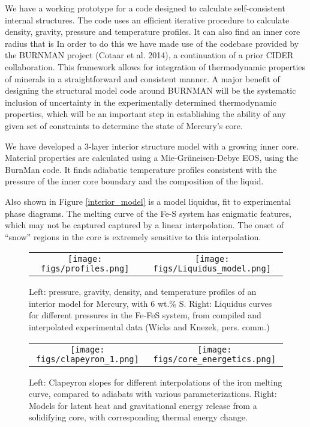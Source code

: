 We have a working prototype for a code designed to calculate self-consistent
internal structures. The code uses an efficient iterative procedure to
calculate density, gravity, pressure and temperature profiles. It can also find
an inner core radius that is In order to do this we have made use of the
codebase provided by the BURNMAN project (Cotaar et al. 2014), a continuation
of a prior CIDER collaboration. This framework allows for integration of
thermodynamic properties of minerals in a straightforward and consistent
manner. A major benefit of designing the structural model code around BURNMAN
will be the systematic inclusion of uncertainty in the experimentally
determined thermodynamic properties, which will be an important step in
establishing the ability of any given set of constraints to determine the state
of Mercury’s core. 

We have developed a 3-layer interior structure model with a growing inner core.
Material properties are calculated using a Mie-Gr\"{u}neisen-Debye EOS, using the BurnMan
code. It finds adiabatic temperature profiles consistent with the pressure of the 
inner core boundary and the composition of the liquid. 

Also shown in Figure \ref{interior_model} is a model liquidus, fit to experimental
phase diagrams. The melting curve of the Fe-S system has enigmatic features, which
may not be captured captured by a  linear interpolation. The onset of ``snow''
regions in the core is extremely sensitive to this interpolation.

 \begin{figure}[H] %
   \centering
\begin{tabular}{cc}
 \texttt{[image: figs/profiles.png]} &
 \texttt{[image: figs/Liquidus\_model.png]} \\
\end{tabular}
   \caption{ Left: pressure, gravity, density, and temperature profiles of an
interior model for Mercury, with 6 wt.\% S.  Right: Liquidus curves for different pressures in the Fe-FeS system, from compiled and interpolated experimental data (Wicks and Knezek, pers. comm.) }
  \label{fig:interior_model}
\end{figure}


 \begin{figure}[H] %
   \centering
\begin{tabular}{cc}
 \texttt{[image: figs/clapeyron\_1.png]} &
 \texttt{[image: figs/core\_energetics.png]} \\
\end{tabular}
\caption{Left: Clapeyron slopes for different interpolations of the iron
melting curve, compared to adiabats with various parameterizations.  Right:  Models
for latent heat and gravitational energy release from a solidifying core, with
corresponding thermal energy change.}
\label{fig:core_energy}
\end{figure}


